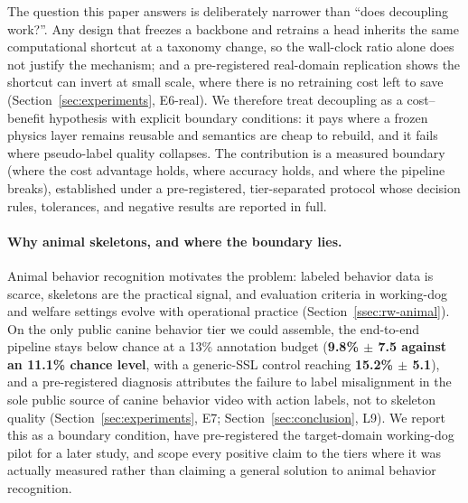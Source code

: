The question this paper answers is deliberately narrower than ``does decoupling work?''. Any design that freezes a backbone and retrains a head inherits the same computational shortcut at a taxonomy change, so the wall-clock ratio alone does not justify the mechanism; and a pre-registered real-domain replication shows the shortcut can invert at small scale, where there is no retraining cost left to save (Section~\ref{sec:experiments}, E6-real). We therefore treat decoupling as a cost--benefit hypothesis with explicit boundary conditions: it pays where a frozen physics layer remains reusable and semantics are cheap to rebuild, and it fails where pseudo-label quality collapses. The contribution is a measured boundary (where the cost advantage holds, where accuracy holds, and where the pipeline breaks), established under a pre-registered, tier-separated protocol whose decision rules, tolerances, and negative results are reported in full.

\paragraph{Why animal skeletons, and where the boundary lies.}
Animal behavior recognition motivates the problem: labeled behavior data is scarce, skeletons are the practical signal, and evaluation criteria in working-dog and welfare settings evolve with operational practice (Section~\ref{ssec:rw-animal}). On the only public canine behavior tier we could assemble, the end-to-end pipeline stays below chance at a 13\% annotation budget (\textbf{9.8\% $\pm$ 7.5 against an 11.1\% chance level}, with a generic-SSL control reaching \textbf{15.2\% $\pm$ 5.1}), and a pre-registered diagnosis attributes the failure to label misalignment in the sole public source of canine behavior video with action labels, not to skeleton quality (Section~\ref{sec:experiments}, E7; Section~\ref{sec:conclusion}, L9). We report this as a boundary condition, have pre-registered the target-domain working-dog pilot for a later study, and scope every positive claim to the tiers where it was actually measured rather than claiming a general solution to animal behavior recognition.

